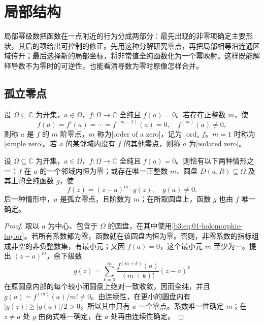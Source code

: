 \section{局部结构}
\label{b3:sec:0104}

局部幂级数把函数在一点附近的行为分成两部分：最先出现的非零项确定主要形状，其后的项给出可控制的修正。先用这种分解研究零点，再把局部相等沿连通区域传开；最后选择新的局部坐标，将非常值全纯函数化为一个幂映射。这样既能解释导数不为零时的可逆性，也能看清导数为零时原像怎样合并。

\subsection{孤立零点}
\label{b3:subsec:010401}

\begin{definition}\label{b3:def:01-zero-order}
设 \(\Omega\subseteq\mathbb C\) 为开集，\(a\in\Omega\)，\(f:\Omega\to\mathbb C\) 全纯且 \(f(a)=0\)。若存在正整数 \(m\)，使
\[
f(a)=f'(a)=\cdots=f^{(m-1)}(a)=0,
\quad f^{(m)}(a)\neq0,
\]
则称 \(a\) 是 \(f\) 的 \(m\) 阶零点，\(m\) 称为[order of a zero]，记为 \(\operatorname{ord}_a f\)。\(m=1\) 时称为[simple zero]。若 \(a\) 的某邻域内没有 \(f\) 的其他零点，则称 \(a\) 为[isolated zero]。
\end{definition}

\begin{proposition}\label{b3:prop:01-zero-factorization}
设 \(\Omega\subseteq\mathbb C\) 为开集，\(a\in\Omega\)，\(f:\Omega\to\mathbb C\) 全纯且 \(f(a)=0\)。则恰有以下两种情形之一：\(f\) 在 \(a\) 的一个邻域内恒为零；或存在唯一正整数 \(m\)、圆盘 \(D(a,R)\subseteq\Omega\) 及其上的全纯函数 \(g\)，使
\begin{equation}\label{b3:eq:01-zero-factorization}
f(z)=(z-a)^m\cdot g(z),
\quad g(a)\neq0.
\end{equation}
后一种情形中，\(a\) 是孤立零点，且阶数为 \(m\)；在所取圆盘上，函数 \(g\) 也由 \(f\) 唯一确定。
\end{proposition}
\begin{proof}
取以 \(a\) 为中心、包含于 \(\Omega\) 的圆盘，在其中使用\eqref{b3:eq:01-holomorphic-taylor}。若所有系数都为零，函数就在该圆盘内恒为零。否则，非零系数的指标组成非空的非负整数集，有最小元；又因 \(f(a)=0\)，这个最小元 \(m\) 至少为一。提出 \((z-a)^m\)，余下级数
\[
g(z)=\sum_{k=0}^\infty\frac{f^{(m+k)}(a)}{(m+k)!}(z-a)^k
\]
在原圆盘内部的每个较小闭圆盘上绝对一致收敛，因而全纯，并且 \(g(a)=f^{(m)}(a)/m!\neq0\)。由连续性，在更小的圆盘内有 \(|g(z)|\geq|g(a)|/2>0\)，所以其中只有 \(a\) 一个零点。系数唯一性确定 \(m\)；在 \(z\neq a\) 处 \(g\) 由商式唯一确定，在 \(a\) 处再由连续性确定。
\end{proof}

